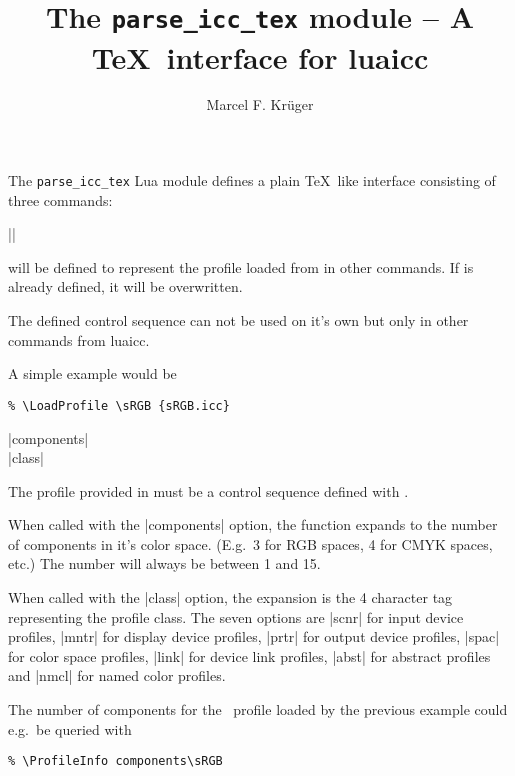 \documentclass{l3doc}
\title{The \texttt{parse\_icc\_tex} module -- A \TeX\ interface for luaicc}
\author{Marcel F. Krüger}
\begin{document}
\maketitle
\begin{documentation}
The \texttt{parse\_icc\_tex} Lua module defines a plain \TeX\ like interface consisting of three commands:

\begin{function}{\LoadProfile}
  \begin{syntax}
    |\LoadProfile|  
  \end{syntax}
   will be defined to represent the profile loaded from  in other commands. If  is already defined, it will be overwritten.

  The defined control sequence  can not be used on it's own but only in other commands from luaicc.

  A simple example would be
\begin{verbatim}
% \LoadProfile \sRGB {sRGB.icc}
\end{verbatim}
\end{function}

\begin{function}[EXP]{\ProfileInfo}
  \begin{syntax}
    |\ProfileInfo components| \\
    |\ProfileInfo class| \\
  \end{syntax}
  The profile provided in  must be a control sequence defined with \cmd\LoadProfile.

  When called with the |components| option, the function expands to the number of components in it's color space. (E.g.\ 3 for RGB spaces, 4 for CMYK spaces, etc.) The number will always be between 1 and 15.

  When called with the |class| option, the expansion is the 4 character tag representing the profile class. The seven options are |scnr| for input device profiles, |mntr| for display device profiles, |prtr| for output device profiles, |spac| for color space profiles, |link| for device link profiles, |abst| for abstract profiles and |nmcl| for named color profiles.

  The number of components for the \cmd\sRGB\ profile loaded by the previous example could e.g.\ be queried with
\begin{verbatim}
% \ProfileInfo components\sRGB
\end{verbatim}
\end{function}


\end{documentation}
\end{document}
